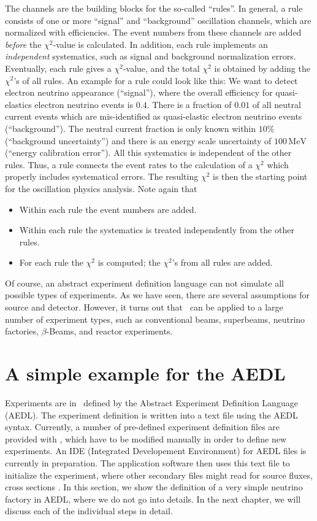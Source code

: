 The channels are the building blocks for the so-called ``rules''. In general, a rule consists of one or more ``signal'' and ``background'' oscillation channels, which are normalized with efficiencies. The event numbers from these channels are added {\em before} the $\chi^2$-value is calculated. In addition, each rule implements an {\em independent} systematics, such as signal and background normalization errors. Eventually, each rule gives a $\chi^2$-value, and the total $\chi^2$ is obtained by adding the $\chi^2$'s of all rules. 
 An example for a rule could look like this: We want to detect electron neutrino appearance (``signal''), where the overall efficiency for quasi-elastics electron neutrino events is $0.4$. There is a fraction of $0.01$ of all neutral current events which are mis-identified as quasi-elastic electron neutrino events (``background''). The neutral current fraction is only known within $10\%$ (``background uncertainty'') and there is
an energy scale uncertainty of $100\,\mathrm{MeV}$ (``energy calibration error'').
All this systematics is independent of the other rules.  Thus, a rule connects the event rates to the calculation of a $\chi^2$ which properly includes 
systematical errors. The resulting $\chi^2$ is then the starting point for the
oscillation physics analysis. Note again that
\begin{itemize}
\item
 Within each rule the event numbers are added.
\item
 Within each rule the systematics is treated independently from the other rules.
\item
 For each rule the $\chi^2$ is computed; the $\chi^2$'s from all rules are added.
\end{itemize}

Of course, an abstract experiment definition language can not simulate all possible types of experiments. As we have seen, there are several assumptions for source and detector. However, it turns out that \GLOBES\ can be applied to a large number of experiment types, such as conventional beams, superbeams, neutrino factories, $\beta$-Beams, and reactor experiments.

\section{A simple example for the AEDL}

Experiments are in \GLOBES\ defined by the Abstract Experiment Definition Language (AEDL). The experiment definition is written into a text file using the AEDL syntax. Currently, a number of pre-defined experiment definition files are provided with \GLOBES , which have to be modified manually in order to define new experiments. An IDE (Integrated Developement Environment) for AEDL files is currently in preparation. The application software then uses this text file to initialize the experiment, where other secondary files might read for source fluxes, cross sections \etc . In this section, we show the definition of a very simple neutrino factory in AEDL, where we do not go into details. In the next chapter, we will discuss each of the individual steps in detail.

